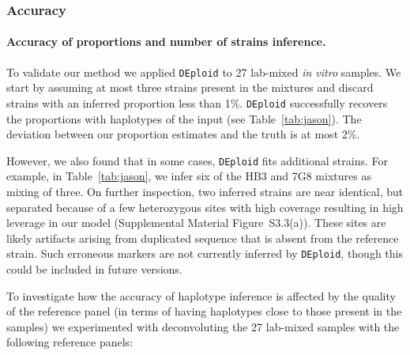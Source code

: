 \documentclass{nature}
\begin{document}
\subsubsection*{Accuracy}

\paragraph{Accuracy of proportions and number of strains inference.}
To validate our method we applied \texttt{DEploid} to 27 lab-mixed {\it in vitro} samples. We start by assuming at most three strains present in the mixtures and discard strains with an inferred proportion less than 1\%. \texttt{DEploid} successfully recovers the proportions with haplotypes of the input (see Table~\ref{tab:jason}). The deviation between our proportion estimates and the truth is at most 2\%.

However, we also found that in some cases, \texttt{DEploid} fits additional strains. For example, in Table~\ref{tab:jason}, we infer six of the HB3 and 7G8 mixtures as mixing of three.  On further inspection, two inferred strains are near identical, but separated because of a few heterozygous sites with high coverage resulting in high leverage in our model (Supplemental Material Figure~S3.3(a)). These sites are likely artifacts arising from duplicated sequence that is absent from the reference strain.  Such erroneous markers are not currently inferred by \texttt{DEploid}, though this could be included in future versions.

To investigate how the accuracy of haplotype inference is affected by the quality of the reference panel (in terms of having haplotypes close to those present in the samples) we experimented with deconvoluting the 27 lab-mixed samples with the following reference panels:
\end{document}
